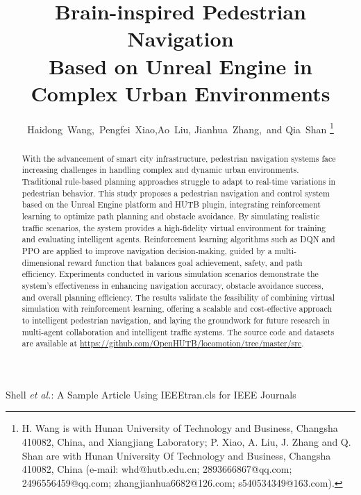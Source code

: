 \documentclass[lettersize,journal]{IEEEtran}
\begin{document}
\title{Brain-inspired Pedestrian Navigation \\ Based on Unreal Engine in Complex Urban Environments}

\author{Haidong~Wang,~Pengfei~Xiao,Ao~Liu, Jianhua~Zhang,~and Qia~Shan
\thanks{H. Wang is with Hunan University of Technology and Business, Changsha 410082, China, and Xiangjiang Laboratory; P. Xiao, A. Liu, J. Zhang and Q. Shan are with Hunan University Of Technology and Business, Changsha 410082, China (e-mail: whd@hutb.edu.cn; 2893666867@qq.com; 2496556459@qq.com; zhangjianhua6682@126.com; s540534349@163.com).}}%

%
{Shell \MakeLowercase{\textit{et al.}}: A Sample Article Using IEEEtran.cls for IEEE Journals}


\maketitle

\begin{abstract}
With the advancement of smart city infrastructure, pedestrian navigation systems face increasing challenges in handling complex and dynamic urban environments. 
Traditional rule-based planning approaches struggle to adapt to real-time variations in pedestrian behavior. 
This study proposes a pedestrian navigation and control system based on the Unreal Engine platform and HUTB plugin, integrating reinforcement learning to optimize path planning and obstacle avoidance. 
By simulating realistic traffic scenarios, the system provides a high-fidelity virtual environment for training and evaluating intelligent agents. 
Reinforcement learning algorithms such as DQN and PPO are applied to improve navigation decision-making, guided by a multi-dimensional reward function that balances goal achievement, safety, and path efficiency. 
Experiments conducted in various simulation scenarios demonstrate the system's effectiveness in enhancing navigation accuracy, obstacle avoidance success, and overall planning efficiency. 
The results validate the feasibility of combining virtual simulation with reinforcement learning, offering a scalable and cost-effective approach to intelligent pedestrian navigation, and laying the groundwork for future research in multi-agent collaboration and intelligent traffic systems.
The source code and datasets are available at \underline 
{https://github.com/OpenHUTB/locomotion/tree/master/src}.
\end{abstract}
\end{document}
